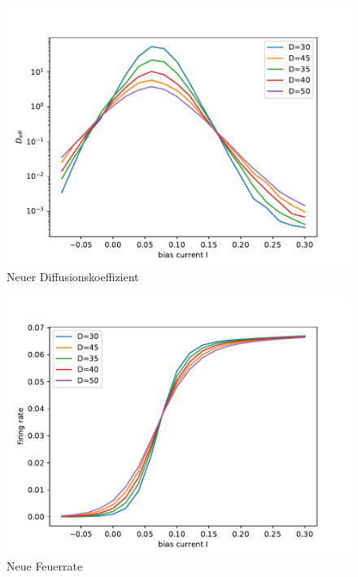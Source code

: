 \documentclass[12pt,a4paper]{article}
\begin{document}
\begin{figure}[H]
	\centering
	\includegraphics[scale=0.9]{d26.pdf}
	\caption{Neuer Diffusionskoeffizient}
	\label{deff}
\end{figure}
\begin{figure}[H]
	\centering
	\includegraphics[scale=0.9]{g26.pdf}
	\caption{Neue Feuerrate}
	\label{g}
\end{figure}
\end{document}
